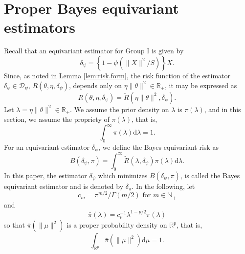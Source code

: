 \documentclass[preprint,11pt]{imsart}
\numberwithin{equation}{section}
\theoremstyle{plain}
\theoremstyle{definition}
\theoremstyle{remark}
\newcommand{\rd}{\mathrm{d}}
\begin{document}
 \section{Proper Bayes equivariant estimators}
 \label{sec:equiv}
Recall that an equivariant estimator for Group I is given by
\begin{equation}\label{eq:equiv.est}
 \delta_{\psi}=\left\{1-\psi(\|X\|^2/S)\right\}X.
\end{equation}
Since, as noted in Lemma \ref{lem:risk.form},
the risk function of the estimator $\delta_\psi \in \mathcal{D}_\psi$,
$ R(\theta,\eta,\delta_{\psi})$, depends only on 
$\eta\|\theta\|^2\in\mathbb{R}_+$, 
it may be expressed as
\begin{equation}\label{eq:thetaeta}
 R(\theta,\eta,\delta_{\psi})=\tilde{R}(\eta\|\theta\|^2, \delta_{\psi}).
\end{equation}
Let $\lambda=\eta\|\theta\|^2\in\mathbb{R}_+$.
We assume the prior density on $\lambda$ is $\pi(\lambda)$, and
in this section, we assume the propriety of $\pi(\lambda)$, that is,
\begin{equation}\label{eq:propriety}
 \int_0^\infty\pi(\lambda) \rd \lambda=1.
\end{equation}
For an equivariant estimator $\delta_\psi$, we define
the Bayes equivariant risk as
\begin{equation}\label{eq:eBrisk}
B(\delta_\psi, \pi)=\int_0^\infty \tilde{R}(\lambda,\delta_{\psi})\pi(\lambda) \rd \lambda.
\end{equation}
In this paper, the estimator $\delta_{\psi}$ which minimizes $B(\delta_\psi, \pi)$,
is called the Bayes equivariant estimator and is denoted by $\delta_\pi$.
In the following, 
let
\begin{equation}\label{eq:c_n}
 c_m=\pi^{m/2}/\Gamma(m/2)\text{ for }m\in\mathbb{N}_+
\end{equation}
and
\begin{equation}\label{pipi*}
 \bar{\pi}(\lambda)=c_p^{-1}\lambda^{1-p/2}\pi(\lambda)
\end{equation}
so that $\bar{\pi}(\|\mu\|^2)$ is a proper probability density on $\mathbb{R}^p$, that is,
\begin{equation}\label{eq:propriety.0}
 \int_{\mathbb{R}^p}\bar{\pi}(\|\mu\|^2)\rd \mu=1.
\end{equation}
\end{document}
